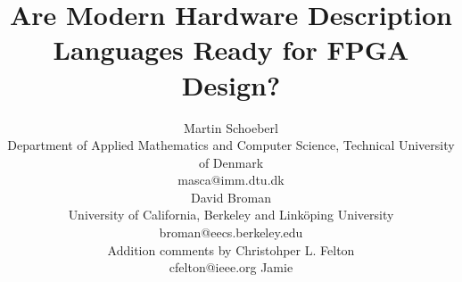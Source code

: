 \documentclass[a4paper, conference]{IEEEtran}
\begin{document}
\newcommand{\shdl} {
  \lstset{keywords={comp,end,def,in,out,if,then,else,true,false,
      int,real,bool,string,int1,int2,int3,int4,int5,int6,int7,int8,
      int16,int32,type}, 
    morecomment=[l]{//},
    morecomment=[s]{/*}{*/}, morestring=[b]{"},
    basicstyle=\ttfamily\small, showstringspaces=false,
    keywordstyle=\bfseries, mathescape=true, }}



\title{Are Modern Hardware Description Languages Ready for FPGA Design?}
\author{Martin Schoeberl\\
Department of Applied Mathematics and Computer Science, 
Technical University of Denmark\\masca@imm.dtu.dk
  \vspace{1ex}\\ 
David Broman\\
University of California, Berkeley and Link{\"o}ping University\\
broman@eecs.berkeley.edu
   \vspace{1ex}\\ 
Addition comments by Christohper L. Felton\\
cfelton@ieee.org
\vspace{1 ex}
Jamie\\
}



\maketitle \thispagestyle{empty}
\end{document}
